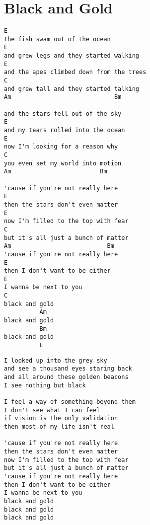 \documentclass[leqno]{memoir}
\begin{document}
\chapter{Black and Gold}
\begin{verbatim}
E
The fish swam out of the ocean
E
and grew legs and they started walking
E
and the apes climbed down from the trees
C
and grew tall and they started talking
Am                             Bm

and the stars fell out of the sky
E
and my tears rolled into the ocean
E
now I'm looking for a reason why
C
you even set my world into motion
Am                         Bm

'cause if you're not really here
E
then the stars don't even matter
E
now I'm filled to the top with fear
C
but it's all just a bunch of matter
Am                           Bm
'cause if you're not really here
E
then I don't want to be either
E
I wanna be next to you
C
black and gold
          Am
black and gold
          Bm
black and gold
          E
\end{verbatim}
\newpage
\begin{verbatim}
I looked up into the grey sky
and see a thousand eyes staring back
and all around these golden beacons
I see nothing but black

I feel a way of something beyond them
I don't see what I can feel
if vision is the only validation
then most of my life isn't real

'cause if you're not really here
then the stars don't even matter
now I'm filled to the top with fear
but it's all just a bunch of matter
'cause if you're not really here
then I don't want to be either
I wanna be next to you
black and gold
black and gold
black and gold
\end{verbatim}
\newpage
\end{document}

